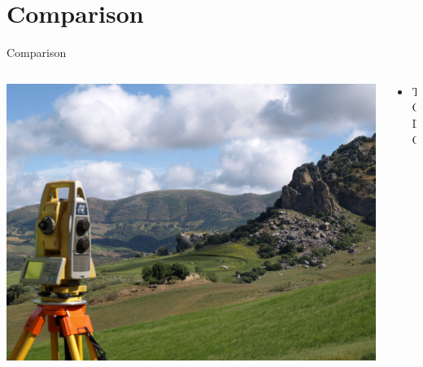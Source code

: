 
\section{Comparison}
\begin{frame}{Comparison}
	\begin{columns}[T] %
		\begin{column}{.48\textwidth}
			\includegraphics[width=\linewidth]{images/background}
		\end{column}%
		\hfill%
		\begin{column}{.56\textwidth}
			\begin{itemize}
				\item TODO
			\end{itemize}
		\end{column}%
	\end{columns}
\end{frame}